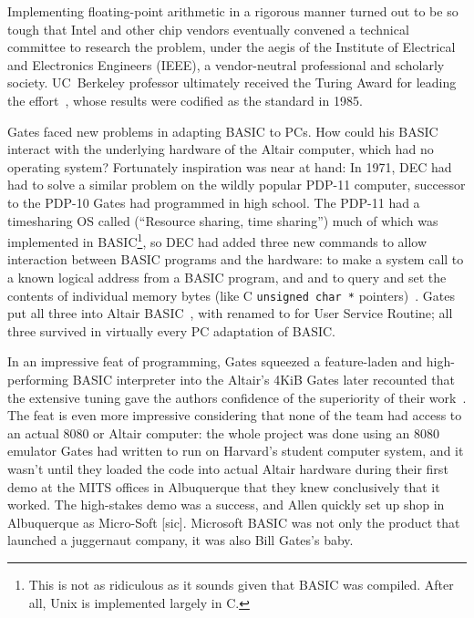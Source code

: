   \begin{tangent}
  Implementing
  floating-point arithmetic in a rigorous manner turned out to be so tough that Intel 
  and other chip vendors eventually convened a technical committee to
  research the problem, under the aegis of the Institute of Electrical and 
  Electronics Engineers (IEEE), a vendor-neutral professional and scholarly
  society. 
  UC~Berkeley professor 
  ultimately received the 
  Turing Award for
  leading the effort~\cite{kahan_interview}, whose results were codified as
  the  standard in 1985.
  \end{tangent}

  \begin{tangent}

Gates faced new problems in adapting BASIC to PCs.
How could his BASIC interact with the underlying hardware of 
the Altair computer, which had no operating
system?
Fortunately inspiration was near at hand:
In 1971, DEC had had to solve a similar problem 
on the wildly popular PDP-11 computer, successor to the PDP-10 Gates had
programmed in high school.
The PDP-11 had a 
timesharing OS called  (``Resource sharing, time
sharing'') much of which was implemented in BASIC\footnote{This is not as
  ridiculous as it sounds given that BASIC was compiled.  After all,
   Unix is implemented largely in C.}, so DEC had added
three new commands to allow interaction between BASIC programs and the
hardware:  to make a system call to a
known logical address from a BASIC program, and
 and  to query and set the contents of individual memory
bytes (like C \texttt{unsigned char~*}
pointers)~\cite[pp.~204--205]{ceruzzi}.
Gates put all three into Altair BASIC~\cite{smithsonian_interview},
with  renamed to  for User Service Routine; all three
survived in virtually every PC adaptation of BASIC.
  \end{tangent}

In an impressive feat of programming, Gates squeezed a 
feature-laden and high-performing BASIC interpreter into the Altair's
4KiB 
Gates later recounted that the extensive tuning gave the authors
confidence of the superiority of their work~\cite{programmers_at_work}.
The feat is even more impressive considering that none of the team had
access to an actual 8080 or Altair computer: the whole project was done
using an 8080 emulator Gates had written to run on Harvard's student
computer system, and it wasn't until they loaded the code into actual
Altair hardware during their first demo at the MITS offices  in Albuquerque
that they knew conclusively that it worked.
The high-stakes demo was a success, and Allen quickly set up shop in
Albuquerque as Micro-Soft [sic].
Microsoft BASIC was not only the product that launched a juggernaut
company, it was also Bill Gates's baby.

